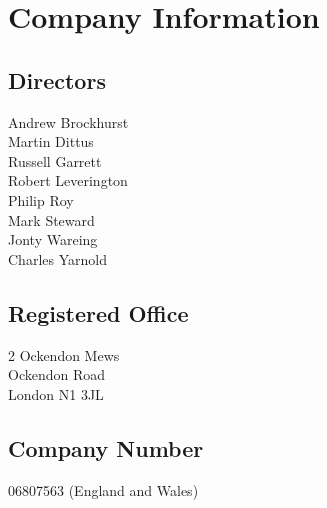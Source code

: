 \tableofcontents
\vfill
\section{Company Information}

\subsection{Directors}
Andrew Brockhurst \\
Martin Dittus \\
Russell Garrett \\
Robert Leverington \\
Philip Roy \\
Mark Steward \\
Jonty Wareing \\
Charles Yarnold

\subsection{Registered Office}

2 Ockendon Mews \\
Ockendon Road \\
London N1 3JL

\subsection{Company Number}
06807563 (England and Wales)
